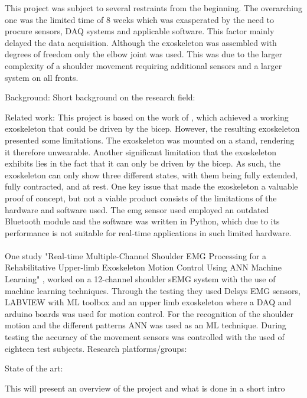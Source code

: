 This project was subject to several restraints from the beginning. The overarching one was the limited time of 8 weeks which was
exasperated by the need to procure sensors, DAQ systems and applicable software. This factor mainly delayed the data acquisition. 
Although the exoskeleton was assembled with degrees of freedom only the elbow joint was used. This was due to the larger complexity 
of a shoulder movement requiring additional sensors and a larger system on all fronts.


Background: 
    Short background on the research field:

    Related work: %
        This project is based on the work of \cite{AFES}, which achieved a working exoskeleton that could be driven by the bicep. However, the resulting 
        exoskeleton presented some limitations. The exoskeleton was mounted on a stand, rendering it therefore unwearable. Another significant limitation 
        that the exoskeleton exhibits lies in the fact that it can only be driven by the bicep. As such, the exoskeleton can only show three different states, 
        with them being fully extended, fully contracted, and at rest. One key issue that made the exoskeleton a valuable proof of concept, but not a viable 
        product consists of the limitations of the hardware and software used. The \acs{emg} sensor used employed an outdated Bluetooth module and the software was 
        written in Python, which due to its performance is not suitable for real-time applications in such limited hardware. 
        \\\\
        One study "Real-time Multiple-Channel Shoulder EMG Processing for a Rehabilitative Upper-limb Exoskeleton Motion Control Using ANN Machine Learning" \cite{shoulderexo},
        worked on a 12-channel shoulder sEMG system with the use of machine learning techniques. Through the testing they used Delsys EMG sensors, LABVIEW with ML toolbox and an 
        upper limb exoskeleton where a DAQ and arduino boards was used for motion control. For the recognition of the shoulder motion and the different patterns ANN was used as an 
        ML technique. During testing the accuracy of the movement sensors was controlled with the used of eighteen test subjects.
    Research platforms/groups:

    State of the art:


    This will present an overview of the project and what is done in a short intro

